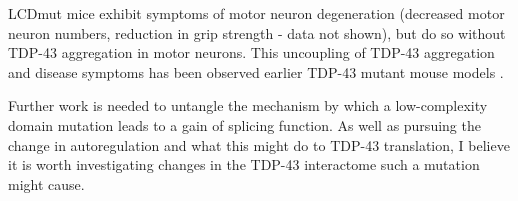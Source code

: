  LCDmut mice exhibit symptoms of motor neuron degeneration (decreased motor neuron numbers, reduction in grip strength - data not shown), but do so without TDP-43 aggregation in motor neurons. 
 This uncoupling of TDP-43 aggregation and disease symptoms has been observed earlier TDP-43 mutant mouse models \citep{Arnold2013}.
 
 Further work is needed to untangle the mechanism by which a low-complexity domain mutation leads to a gain of splicing function.
 As well as pursuing the change in autoregulation and what this might do to TDP-43 translation, I believe it is worth investigating changes in the TDP-43 interactome such a mutation might cause.
 
 
%
%
%
%	
%
%
%	
%	



